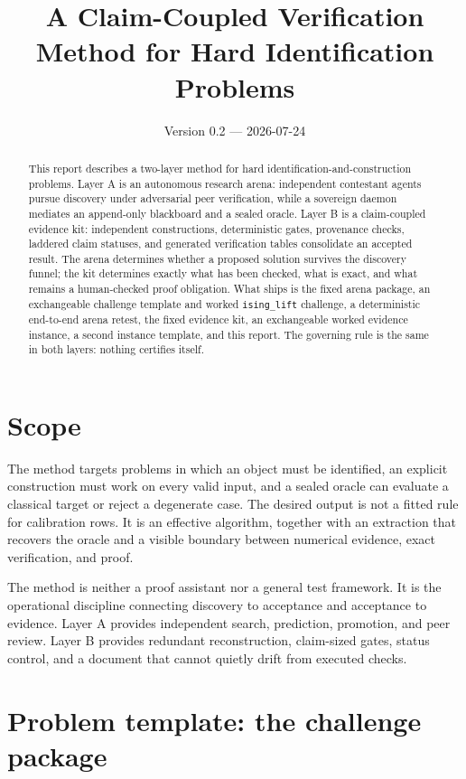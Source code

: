 \documentclass[11pt]{article}
\title{A Claim-Coupled Verification Method for Hard Identification Problems}
\author{}
\date{Version 0.2 --- 2026-07-24}
\newcommand{\code}[1]{\texttt{#1}}
\begin{document}
\maketitle

\begin{abstract}
This report describes a two-layer method for hard
identification-and-construction problems.  Layer A is an autonomous research
arena: independent contestant agents pursue discovery under adversarial peer
verification, while a sovereign daemon mediates an append-only blackboard and
a sealed oracle.  Layer B is a claim-coupled evidence kit: independent
constructions, deterministic gates, provenance checks, laddered claim
statuses, and generated verification tables consolidate an accepted result.
The arena determines whether a proposed solution survives the discovery
funnel; the kit determines exactly what has been checked, what is exact, and
what remains a human-checked proof obligation.  What ships is the fixed arena
package, an exchangeable challenge template and worked \code{ising\_lift}
challenge, a deterministic end-to-end arena retest, the fixed evidence kit,
an exchangeable worked evidence instance, a second instance template, and
this report.  The governing rule is the same in both layers: nothing
certifies itself.
\end{abstract}

\section{Scope}

The method targets problems in which an object must be identified, an
explicit construction must work on every valid input, and a sealed oracle can
evaluate a classical target or reject a degenerate case.  The desired output
is not a fitted rule for calibration rows.  It is an effective algorithm,
together with an extraction that recovers the oracle and a visible boundary
between numerical evidence, exact verification, and proof.

The method is neither a proof assistant nor a general test framework.  It is
the operational discipline connecting discovery to acceptance and acceptance
to evidence.  Layer A provides independent search, prediction, promotion, and
peer review.  Layer B provides redundant reconstruction, claim-sized gates,
status control, and a document that cannot quietly drift from executed
checks.

\section{Problem template: the challenge package}
\end{document}
